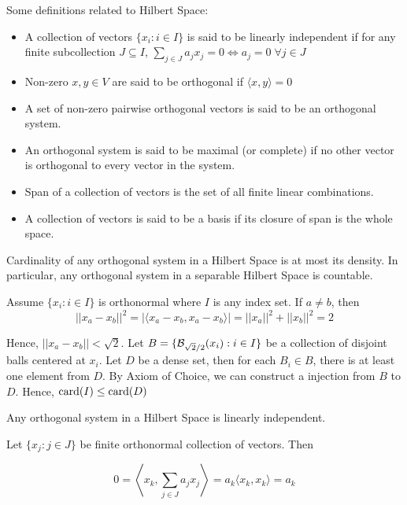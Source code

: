 \documentclass{report}
\begin{document}
\begin{definition}
    Some definitions related to Hilbert Space:
    \begin{itemize}
        \item A collection of vectors $\{x_i: i \in I \}$ is said to be linearly independent if for any finite subcollection $J \subseteq I$, $\sum_{j \in J} a_j x_j = 0 \iff a_j = 0 \;\forall j \in J$
        \item Non-zero $x, y \in V$ are said to be orthogonal if $\langle x, y\rangle = 0$
        \item A set of non-zero pairwise orthogonal vectors is said to be an orthogonal system.
        \item An orthogonal system is said to be maximal (or complete) if no other vector is orthogonal to every vector in the system.
        \item Span of a collection of vectors is the set of all finite linear combinations.
        \item A collection of vectors is said to be a basis if its closure of span is the whole space.
    \end{itemize}
\end{definition}

\begin{theorem}
    Cardinality of any orthogonal system in a Hilbert Space is at most its density. In particular, any orthogonal system in a separable Hilbert Space is countable.
\end{theorem}

Assume $\{x_i: i \in I\}$ is orthonormal where $I$ is any index set. If $a \neq b$, then
\[
    ||x_a - x_b||^2 = |\langle x_a - x_b, x_a - x_b \rangle| = ||x_a||^2 + ||x_b||^2 = 2
\]

Hence, $||x_a - x_b|| < \sqrt{2}$. Let $B = \{ \mathcal{B}_{\sqrt{2}/2}(x_i): i \in I\}$ be a collection of disjoint balls centered at $x_i$. Let $D$ be a dense set, then for each $B_i \in B$, there is at least one element from $D$. By Axiom of Choice, we can construct a injection from $B$ to $D$. Hence, $\operatorname{card}(I) \leq \operatorname{card}(D)$

\begin{theorem}
    Any orthogonal system in a Hilbert Space is linearly independent.
\end{theorem}

Let $\{x_j: j \in J\}$ be finite orthonormal collection of vectors. Then

\[
    0 = \left\langle x_k, \sum_{j \in J} a_j x_j \right\rangle = a_k \langle x_k, x_k \rangle = a_k
\]
\end{document}
